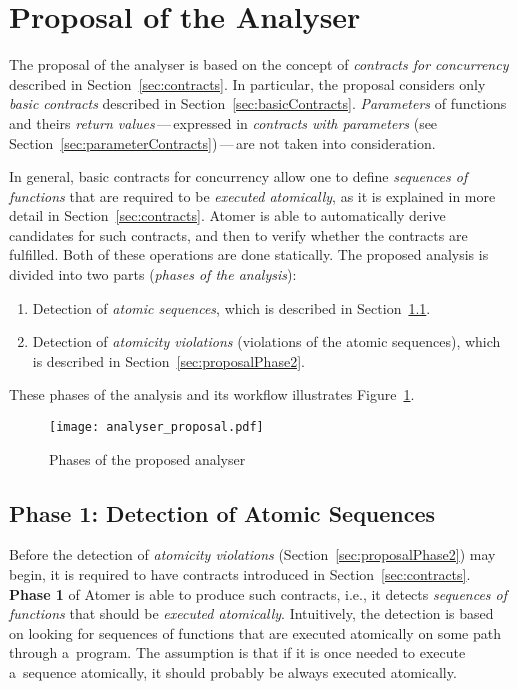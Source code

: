 \section{Proposal of the Analyser}
\label{sec:proposal}

The proposal of the analyser is based on the concept of \emph{contracts 
for concurrency} described in Section~\ref{sec:contracts}. In particular,
the proposal considers only \emph{basic contracts} described in
Section~\ref{sec:basicContracts}. \emph{Parameters} of functions and theirs
\emph{return values}\,---\,expressed in \emph{contracts with parameters}
(see Section~\ref{sec:parameterContracts})\,---\,are not taken into
consideration.

In general, basic contracts for concurrency allow one to define 
\emph{sequences of functions} that are required to be \emph{executed
atomically}, as it is explained in more detail in Section~\ref{sec:contracts}.
Atomer is able to automatically derive candidates for such contracts, and
then to verify whether the contracts are fulfilled. Both of these operations
are done statically. The proposed analysis is divided into two parts
(\emph{phases of the analysis}):
\begin{enumerate}[label={\textbf{Phase \arabic*}:}, leftmargin=6em]
    \item
        Detection of \emph{atomic sequences}, which is described in
        Section~\ref{sec:proposalPhase1}.
    
    \item
        Detection of \emph{atomicity violations} (violations of the atomic
        sequences), which is described in Section~\ref{sec:proposalPhase2}.
\end{enumerate}
These phases of the analysis and its workflow illustrates
Figure~\ref{fig:analyserPhases}.

\begin{figure}[hbt]
    \centering
    \texttt{[image: analyser\_proposal.pdf]}
    \caption{Phases of the proposed analyser}
    \label{fig:analyserPhases}
\end{figure}


\subsection{Phase 1: Detection of Atomic Sequences}
\label{sec:proposalPhase1}

Before the detection of \emph{atomicity violations}
(Section~\ref{sec:proposalPhase2}) may begin, it is required to have
contracts introduced in Section~\ref{sec:contracts}. \textbf{Phase 1}
of Atomer is able to produce such contracts, i.e., it detects
\emph{sequences of functions} that should be \emph{executed atomically}.
Intuitively, the detection is based on looking for sequences of
functions that are executed atomically on some path through
a~program. The assumption is that if it is once needed to execute
a~sequence atomically, it should probably be always executed atomically.

